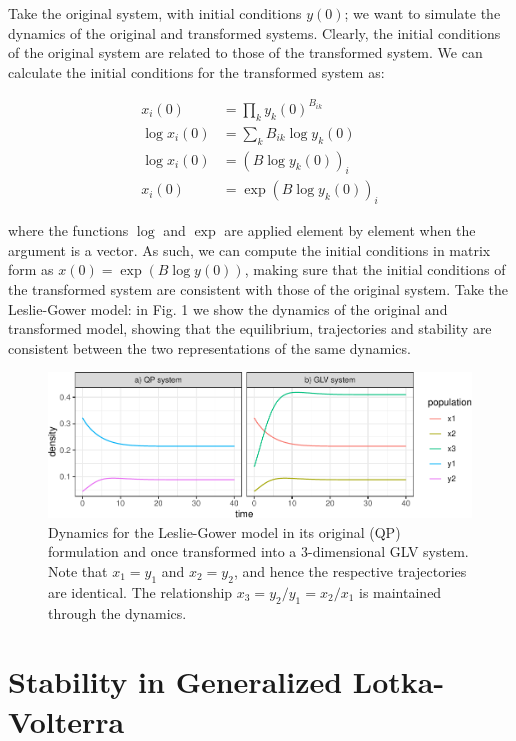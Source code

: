 \documentclass{article}
\begin{document}
Take the original system, with initial conditions \(y(0)\); we want to
simulate the dynamics of the original and transformed systems. Clearly,
the initial conditions of the original system are related to those of
the transformed system. We can calculate the initial conditions for the
transformed system as:

\begin{equation}
\begin{aligned}
x_i(0) &= \prod_{k} {y_k(0)}^{B_{ik}}\\
\log x_i(0) &= \sum_k B_{ik} \log y_k(0)\\
\log x_i(0) &= (B \log y_k(0))_i\\
x_i(0) &= \exp(B \log y_k(0))_i
\end{aligned}
\end{equation}

where the functions \(\log\) and \(\exp\) are applied element by element
when the argument is a vector. As such, we can compute the initial
conditions in matrix form as \(x(0) = \exp(B \log y(0))\), making sure
that the initial conditions of the transformed system are consistent
with those of the original system. Take the Leslie-Gower model: in Fig.
1 we show the dynamics of the original and transformed model, showing
that the equilibrium, trajectories and stability are consistent between
the two representations of the same dynamics.

\begin{figure}
\centering
\includegraphics{GLV_embedding_files/figure-latex/fig1-1.pdf}
\caption{Dynamics for the Leslie-Gower model in its original (QP)
formulation and once transformed into a 3-dimensional GLV system. Note
that \(x_1 = y_1\) and \(x_2 = y_2\), and hence the respective
trajectories are identical. The relationship
\(x_3 = y_2 / y_1 = x_2 / x_1\) is maintained through the dynamics.}
\end{figure}

\hypertarget{stability-in-generalized-lotka-volterra}{%
\section{Stability in Generalized
Lotka-Volterra}\label{stability-in-generalized-lotka-volterra}}
\end{document}
